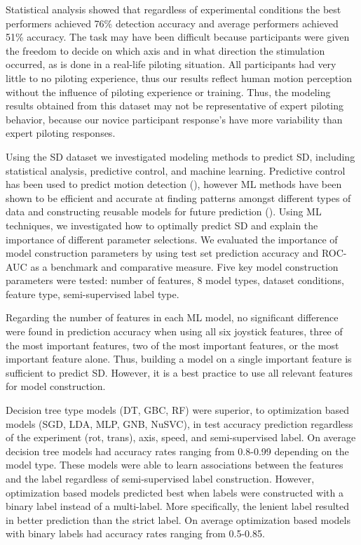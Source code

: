 \documentclass[11pt, onecolumn]{article}
\begin{document}
Statistical analysis showed that regardless of experimental conditions the best performers achieved 76\% detection accuracy and average performers achieved 51\% accuracy.  The task may have been difficult because participants were given the freedom to decide on which axis and in what direction the stimulation occurred, as is done in a real-life piloting situation.  All participants had very little to no piloting experience, thus our results reflect human motion perception without the influence of piloting experience or training.  Thus, the modeling results obtained from this dataset may not be representative of expert piloting behavior,  because our novice participant response's have more variability than expert piloting responses.

Using the SD dataset we investigated modeling methods to predict SD, including statistical analysis, predictive control, and machine learning.  Predictive control has been used to predict motion detection (\cite{Soyka_2011_Predicting}), however ML methods have been shown to be efficient and accurate at finding patterns amongst different types of data and constructing reusable models for future prediction (\cite{Burkov_2019_ML}).  Using ML techniques, we investigated how to optimally predict SD and explain the importance of different parameter selections.  We evaluated the importance of model construction parameters by using test set prediction accuracy and ROC-AUC as a benchmark and comparative measure.  Five key model construction parameters were tested: number of features, 8 model types, dataset conditions, feature type, semi-supervised label type.

Regarding the number of features in each ML model, no significant difference were found in prediction accuracy when using all six joystick features, three of the most important features, two of the most important features, or the most important feature alone. Thus, building a model on a single important feature is sufficient to predict SD.  However, it is a best practice to use all relevant features for model construction.

Decision tree type models (DT, GBC, RF) were superior, to optimization based models (SGD, LDA, MLP, GNB, NuSVC), in test accuracy prediction regardless of the experiment (rot, trans), axis, speed, and semi-supervised label.  On average decision tree models had accuracy rates ranging from 0.8-0.99 depending on the model type.  These models were able to learn associations between the features and the label regardless of semi-supervised label construction.  However, optimization based models predicted best when labels were constructed with a binary label instead of a multi-label.  More specifically, the lenient label resulted in better prediction than the strict label.  On average optimization based models with binary labels had accuracy rates ranging from 0.5-0.85. 
\end{document}
